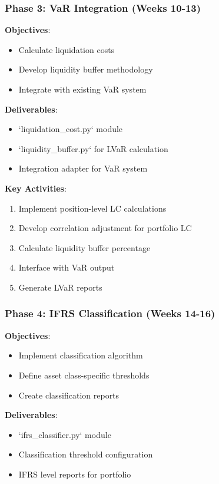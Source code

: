\documentclass[11pt,a4paper]{article}
\begin{document}
\subsubsection{Phase 3: VaR Integration (Weeks 10-13)}

\textbf{Objectives}:
\begin{itemize}
    \item Calculate liquidation costs
    \item Develop liquidity buffer methodology
    \item Integrate with existing VaR system
\end{itemize}

\textbf{Deliverables}:
\begin{itemize}
    \item `liquidation\_cost.py` module
    \item `liquidity\_buffer.py` for LVaR calculation
    \item Integration adapter for VaR system
\end{itemize}

\textbf{Key Activities}:
\begin{enumerate}
    \item Implement position-level LC calculations
    \item Develop correlation adjustment for portfolio LC
    \item Calculate liquidity buffer percentage
    \item Interface with VaR output
    \item Generate LVaR reports
\end{enumerate}

\subsubsection{Phase 4: IFRS Classification (Weeks 14-16)}

\textbf{Objectives}:
\begin{itemize}
    \item Implement classification algorithm
    \item Define asset class-specific thresholds
    \item Create classification reports
\end{itemize}

\textbf{Deliverables}:
\begin{itemize}
    \item `ifrs\_classifier.py` module
    \item Classification threshold configuration
    \item IFRS level reports for portfolio
\end{itemize}
\end{document}
